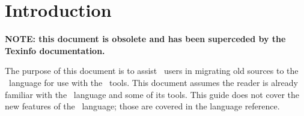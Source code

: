 
\section{Introduction}
\label{sec:intro}

\textbf{NOTE: this document is obsolete and has been superceded by
the Texinfo documentation.}

The purpose of this document is to assist \CAST\ users in migrating
old sources to the \hac\ language for use with the \hackt\ tools.  
This document assumes the reader is already familiar with the \CAST\ language
and some of its tools.  
This guide does not cover the new features of the \hac\ language; 
those are covered in the language reference.  

